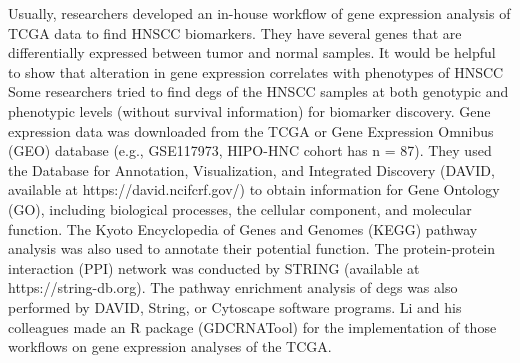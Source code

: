 \documentclass[jpm,article,submit,moreauthors,pdftex]{Definitions/mdpi}
\newenvironment{MyColorPar}[1]{%
    \leavevmode\color{#1}\ignorespaces%
}{%
}%
\begin{document}
\begin{MyColorPar}{red}
Usually, researchers developed an in-house workflow of gene expression analysis of TCGA data to find HNSCC biomarkers.
They have several genes that are differentially expressed between tumor and normal samples.
It would be helpful to show that alteration in gene expression correlates with phenotypes of HNSCC
Some researchers\cite{Loraine2015a}\cite{Tonella2017a}\cite{Zhao2018}\cite{Li2018a}\cite{Huang2019}\cite{Shen2019}\cite{Schmitt2019}\cite{Xu2021a} tried to find \acrfull{degs} of the HNSCC samples at both genotypic and phenotypic levels (without survival information) for biomarker discovery.
Gene expression data was downloaded from the TCGA or Gene Expression Omnibus (GEO) database (e.g., GSE117973\cite{Schmitt2019}, HIPO-HNC cohort has n = 87).
They used the Database for Annotation, Visualization, and Integrated Discovery (DAVID, available at https://david.ncifcrf.gov/) to obtain information for Gene Ontology (GO), including biological processes, the cellular component, and molecular function. 
The Kyoto Encyclopedia of Genes and Genomes (KEGG) pathway analysis was also used to annotate their potential function.
The protein-protein interaction (PPI) network was conducted by STRING (available at https://string-db.org).
The pathway enrichment analysis of \acrshort{degs} was also performed by DAVID, String, or Cytoscape software programs\cite{Huang2019}\cite{Shen2019}.
Li\cite{Li2018a} and his colleagues made an R package (GDCRNATool) for the implementation of those workflows on gene expression analyses of the TCGA.

\end{MyColorPar}
\end{document}
